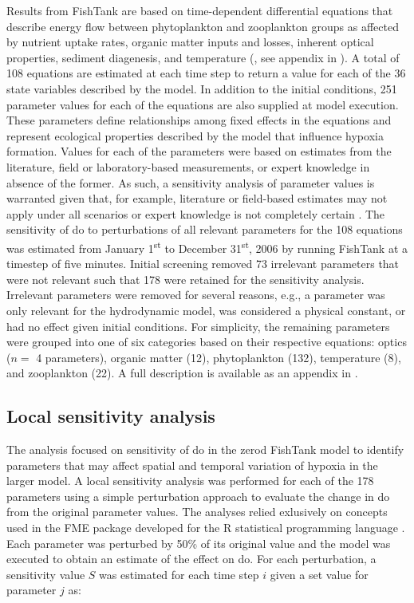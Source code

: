 \documentclass[letterpaper,12pt,oneside]{article}\usepackage[]{graphicx}\usepackage[]{color}
\begin{document}
Results from FishTank are based on time-dependent differential equations that describe energy flow between phytoplankton and zooplankton groups as affected by nutrient uptake rates, organic matter inputs and losses, inherent optical properties, sediment diagenesis, and temperature (\citealt{Penta08,Eldridge10}, see appendix in ).  A total of 108 equations are estimated at each time step to return a value for each of the 36 state variables described by the model.  In addition to the initial conditions, 251 parameter values for each of the equations are also supplied at model execution.  These parameters define relationships among fixed effects in the equations and represent ecological properties described by the model that influence hypoxia formation.  Values for each of the parameters were based on estimates from the literature, field or laboratory-based measurements, or expert knowledge in absence of the former.  As such, a sensitivity analysis of parameter values is warranted given that, for example, literature or field-based estimates may not apply under all scenarios or expert knowledge is not completely certain \citep{Refsgaard07}.  The sensitivity of \ac{do} to perturbations of all relevant parameters for the 108 equations was estimated from January 1\textsuperscript{st} to December 31\textsuperscript{st}, 2006 by running FishTank at a timestep of five minutes.  Initial screening removed 73 irrelevant parameters that were not relevant such that 178 were retained for the sensitivity analysis.  Irrelevant parameters were removed for several reasons, e.g., a parameter was only relevant for the hydrodynamic model, was considered a physical constant, or had no effect given initial conditions.  For simplicity, the remaining parameters were grouped into one of six categories based on their respective equations: optics ($n = $ 4 parameters), organic matter (12), phytoplankton (132), temperature (8), and zooplankton (22).  A full description is available as an appendix in .  

\subsection{Local sensitivity analysis}

The analysis focused on sensitivity of \ac{do} in the \ac{zerod} FishTank model to identify parameters that may affect spatial and temporal variation of hypoxia in the larger model.  A local sensitivity analysis was performed for each of the 178 parameters using a simple perturbation approach to evaluate the change in \ac{do} from the original parameter values.  The analyses relied exlusively on concepts used in the FME package developed for the R statistical programming language \citep{Soetaert10}. Each parameter was perturbed by 50\% of its original value and the model was executed to obtain an estimate of the effect on \ac{do}.  For each perturbation, a sensitivity value $S$ was estimated for each time step $i$ given a set value for parameter $j$ as:
\end{document}

